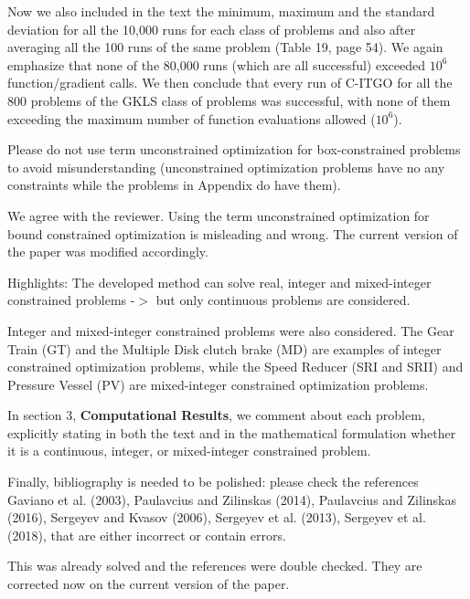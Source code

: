 \begin{revAns}
Now we also included in the text the minimum, maximum and the standard deviation for all the 10,000 runs for each class of problems and also after averaging all the 100 runs of the same problem (Table 19, page 54). We again emphasize that none of the 80,000 runs (which are all successful) exceeded $10^6$ function/gradient calls. We then conclude that every run of C-ITGO for all the 800 problems of the GKLS class of problems was successful, with none of them exceeding the maximum number of function evaluations allowed ($10^6$).


\end{revAns}


\begin{revAns}{Please do not use term unconstrained optimization for box-constrained problems to avoid misunderstanding (unconstrained optimization problems have no any constraints while the problems in Appendix do have them).}

We agree with the reviewer. Using the term unconstrained optimization for bound constrained optimization is misleading and wrong. The current version of the paper was modified accordingly. %

\end{revAns}


\begin{revAns}{Highlights: The developed method can solve real, integer and mixed-integer constrained problems -$>$ but only continuous problems are considered.}

Integer and mixed-integer constrained problems were also considered. The Gear Train (GT) and the Multiple Disk clutch brake (MD) are examples of integer constrained optimization problems, while the Speed Reducer (SRI and SRII) and Pressure Vessel (PV) are mixed-integer constrained optimization problems.

In section 3, \textbf{Computational Results}, we comment about each problem, explicitly stating in both the text and in the mathematical formulation whether it is a continuous, integer, or mixed-integer constrained problem.

\end{revAns}



\begin{revAns}{Finally, bibliography is needed to be polished: please check the references Gaviano et al. (2003), Paulavcius and Zilinskas (2014), Paulavcius and Zilinskas (2016), Sergeyev and Kvasov (2006), Sergeyev et al. (2013), Sergeyev et al. (2018), that are either incorrect or contain errors.}

This was already solved and the references were double checked. They are corrected now on the current version of the paper.

\end{revAns}